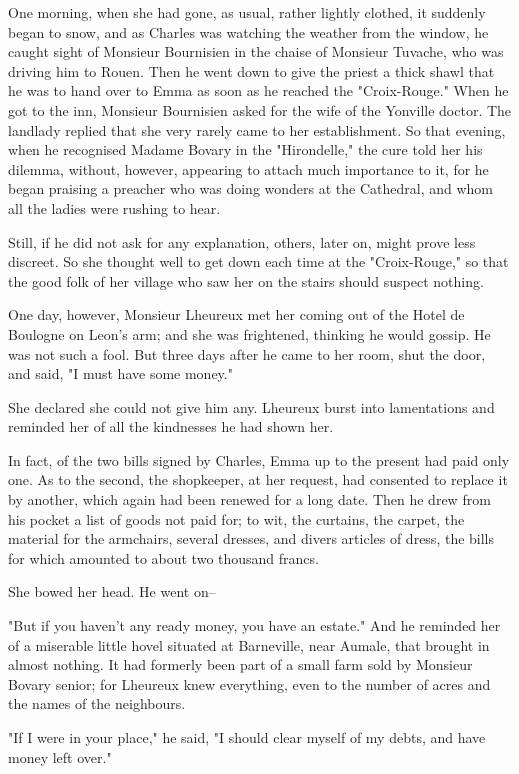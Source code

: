 \documentclass[11pt,twocolumn]{ltugboat}
\begin{document}
One morning, when she had gone, as usual, rather lightly clothed, it
suddenly began to snow, and as Charles was watching the weather from the
window, he caught sight of Monsieur Bournisien in the chaise of Monsieur
Tuvache, who was driving him to Rouen. Then he went down to give the
priest a thick shawl that he was to hand over to Emma as soon as he
reached the "Croix-Rouge." When he got to the inn, Monsieur Bournisien
asked for the wife of the Yonville doctor. The landlady replied that
she very rarely came to her establishment. So that evening, when he
recognised Madame Bovary in the "Hirondelle," the cure told her his
dilemma, without, however, appearing to attach much importance to it,
for he began praising a preacher who was doing wonders at the Cathedral,
and whom all the ladies were rushing to hear.

Still, if he did not ask for any explanation, others, later on, might
prove less discreet. So she thought well to get down each time at the
"Croix-Rouge," so that the good folk of her village who saw her on the
stairs should suspect nothing.

One day, however, Monsieur Lheureux met her coming out of the Hotel
de Boulogne on Leon's arm; and she was frightened, thinking he would
gossip. He was not such a fool. But three days after he came to her
room, shut the door, and said, "I must have some money."

She declared she could not give him any. Lheureux burst into
lamentations and reminded her of all the kindnesses he had shown her.

In fact, of the two bills signed by Charles, Emma up to the present had
paid only one. As to the second, the shopkeeper, at her request, had
consented to replace it by another, which again had been renewed for a
long date. Then he drew from his pocket a list of goods not paid for; to
wit, the curtains, the carpet, the material for the armchairs, several
dresses, and divers articles of dress, the bills for which amounted to
about two thousand francs.

She bowed her head. He went on--

"But if you haven't any ready money, you have an estate." And he
reminded her of a miserable little hovel situated at Barneville, near
Aumale, that brought in almost nothing. It had formerly been part of a
small farm sold by Monsieur Bovary senior; for Lheureux knew everything,
even to the number of acres and the names of the neighbours.

"If I were in your place," he said, "I should clear myself of my debts,
and have money left over."
\end{document}
